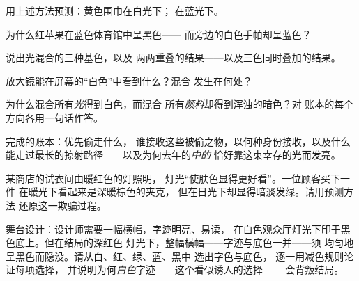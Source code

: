 \begin{exercise}[$\star$]\label{exo:g8:colors-spectra:5}
用上述方法预测：黄色围巾在白光下；
在蓝光下。
\end{exercise}

\begin{exercise}[$\star$]\label{exo:g8:colors-spectra:6}
为什么红苹果在蓝色体育馆中呈黑色——
而旁边的白色手帕却呈蓝色？
\end{exercise}

\begin{exercise}[$\star$]\label{exo:g8:colors-spectra:7}
说出光混合的三种基色，以及
两两重叠的结果——以及三色同时叠加的结果。
\end{exercise}

\begin{exercise}[$\star$]\label{exo:g8:colors-spectra:8}
放大镜能在屏幕的“白色”中看到什么？混合
发生在何处？
\end{exercise}

\begin{exercise}[$\star\star$]\label{exo:g8:colors-spectra:9}
为什么混合所有\emph{光}得到白色，而混合
所有\emph{颜料}却得到浑浊的暗色？对
账本的每个方向各用一句话作答。
\end{exercise}

\begin{exercise}[$\star\star$]\label{exo:g8:colors-spectra:10}
完成的账本：优先偷走什么，
谁接收这些被偷之物，以何种身份接收，以及什么
能走过最长的掠射路径——以及为何去年的\emph{中的}
恰好靠这束幸存的光而发亮。
\end{exercise}

\begin{exercise}[$\star\star$]\label{exo:g8:colors-spectra:11}
某商店的试衣间由暖红色的灯照明，
灯光“使肤色显得更好看”。一位顾客买下一件
在暖光下看起来是深暖棕色的夹克，
但在日光下却显得暗淡发绿。请用预测方法
还原这一欺骗过程。
\end{exercise}

\begin{exercise}[$\star\star\star$]\label{exo:g8:colors-spectra:12}
舞台设计：设计师需要一幅横幅，字迹明亮、易读，
在白色观众厅灯光下印于黑色底上。但在结局的深红色
灯光下，整幅横幅——字迹与底色一并——须
均匀地呈黑色而隐没。请从白、红、绿、蓝、黑中
选出字色与底色，
逐一用减色规则论证每项选择，
并说明为何\emph{白色}字迹——这个看似诱人的选择——
会背叛结局。
\end{exercise}

